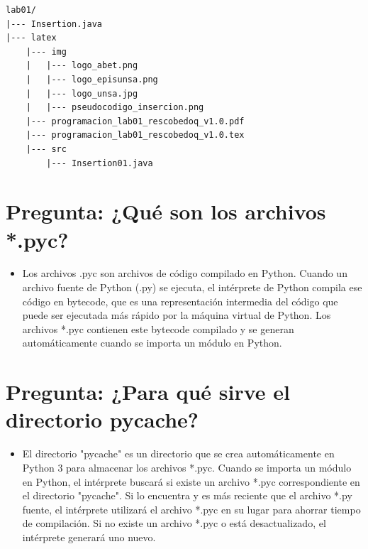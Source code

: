 \documentclass{article}
\begin{document}
\begin{lstlisting}[style=ascii-tree]
lab01/
|--- Insertion.java
|--- latex
    |--- img
    |   |--- logo_abet.png
    |   |--- logo_episunsa.png
    |   |--- logo_unsa.jpg
    |   |--- pseudocodigo_insercion.png    
    |--- programacion_lab01_rescobedoq_v1.0.pdf    
    |--- programacion_lab01_rescobedoq_v1.0.tex
    |--- src
        |--- Insertion01.java
\end{lstlisting}    

\section{Pregunta: ¿Qué son los archivos *.pyc?}
	\begin{itemize}
		\item Los archivos .pyc son archivos de código compilado en Python. Cuando un archivo fuente de Python (.py) se ejecuta, el intérprete de Python compila ese código en bytecode, que es una representación intermedia del código que puede ser ejecutada más rápido por la máquina virtual de Python. Los archivos *.pyc contienen este bytecode compilado y se generan automáticamente cuando se importa un módulo en Python.
	\end{itemize}	
	\section{Pregunta: ¿Para qué sirve el directorio pycache?}
	\begin{itemize}
		\item El directorio "pycache" es un directorio que se crea automáticamente en Python 3 para almacenar los archivos *.pyc. Cuando se importa un módulo en Python, el intérprete buscará si existe un archivo *.pyc correspondiente en el directorio "pycache". Si lo encuentra y es más reciente que el archivo *.py fuente, el intérprete utilizará el archivo *.pyc en su lugar para ahorrar tiempo de compilación. Si no existe un archivo *.pyc o está desactualizado, el intérprete generará uno nuevo.
	\end{itemize}	
\end{document}
